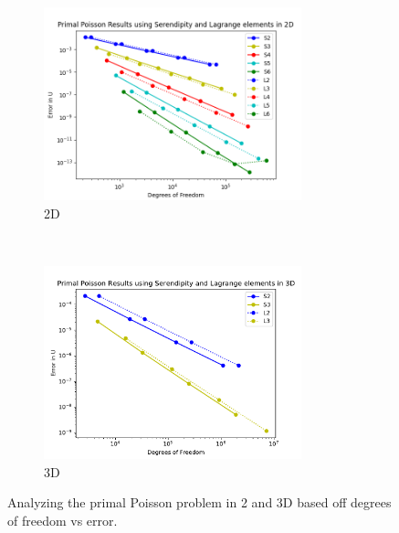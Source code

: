 \documentclass[manuscript,screen]{acmart}
\begin{document}
\begin{figure}[h!]
  \centering
  \begin{subfigure}[h]{0.5\textwidth}
    \centering
    \includegraphics[height=2.2in]{2dPrimalPoisson.png}
    \caption{2D}
    \label{fig:2dPrimalDofs}
  \end{subfigure}
  ~
  \begin{subfigure}[h]{0.5\textwidth}
    \centering
    \includegraphics[height=2.2in]{3dPrimalDofs.pdf}
    \caption{3D}
    \label{fig:3dPrimalDofs}
  \end{subfigure}
  \caption{Analyzing the primal Poisson problem in 2 and 3D based off degrees of freedom vs error.}
\end{figure}  


\end{document}
